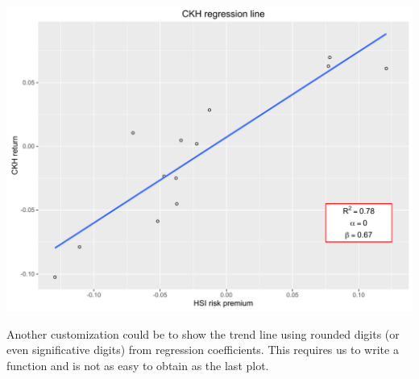 \documentclass[]{article}
\begin{document}
\begin{center}\includegraphics{0_all_posts_pdf/lr_12-1} \end{center}

Another customization could be to show the trend line using rounded
digits (or even significative digits) from regression coefficients. This
requires us to write a function and is not as easy to obtain as the last
plot.
\end{document}
